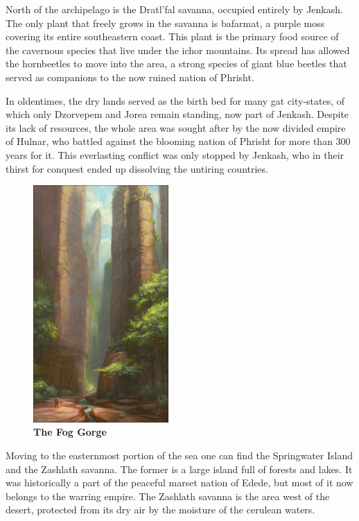 North of the archipelago is the Dratl'fal savanna, occupied entirely by Jenkash.
The only plant that freely grows in the savanna is bafarmat, a purple moss covering its entire southeastern coast.
This plant is the primary food source of the cavernous species that live under the ichor mountains.
Its spread has allowed the hornbeetles to move into the area, a strong species of giant blue beetles that served as companions to the now ruined nation of Phrisht.

In oldentimes, the dry lands served as the birth bed for many gat city-states, of which only Dzorvepem and Jorea remain standing, now part of Jenkash.
Despite its lack of resources, the whole area was sought after by the now divided empire of Hulnar, who battled against the blooming nation of Phrisht for more than 300 years for it.
This everlasting conflict was only stopped by Jenkash, who in their thirst for conquest ended up dissolving the untiring countries.

\begin{figure}[t]
    \centering
    \includegraphics[width=0.46\textwidth]{01intro/img/14fog_gorge.png}
    \caption*{\centering \large{\textbf{The Fog Gorge}}} %
\end{figure}

Moving to the easternmost portion of the sea one can find the Springwater Island and the Zashlath savanna.
The former is a large island full of forests and lakes.
It was historically a part of the peaceful marset nation of Edede, but most of it now belongs to the warring empire.
The Zashlath savanna is the area west of the desert, protected from its dry air by the moisture of the cerulean waters.
